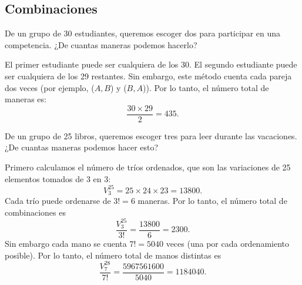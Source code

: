 \documentclass[12pt,a4paper]{book}
\begin{document}
    \subsection{Combinaciones}

    \begin{mdframed}[style=mdgraybox,frametitle={Problema 20: Selección de dos estudiantes}]
        De un grupo de 30 estudiantes, queremos escoger dos para participar en una
        competencia. ¿De cuantas maneras podemos hacerlo?
    \end{mdframed}

    \begin{solucion}
        El primer estudiante puede ser cualquiera de los 30. El segundo estudiante puede
        ser cualquiera de los 29 restantes. Sin embargo, este método cuenta cada pareja
        dos veces (por ejemplo, ($A,B$) y ($B,A$)). Por lo tanto, el número total de maneras
        es:
        \begin{equation*}
            \frac{30\times29}{2}=435.
        \end{equation*}
    \end{solucion}

    \begin{mdframed}[style=mdgraybox,frametitle={Problema 22: Mano de dominó}]
        De un grupo de 25 libros, queremos escoger tres para leer durante las vacaciones.
        ¿De cuantas maneras podemos hacer esto?
    \end{mdframed}

    \begin{solucion}
        Primero calculamos el número de tríos ordenados, que son las variaciones de 25 elementos
        tomados de 3 en 3:
        \begin{equation*}
            V_{3}^{25}=25\times24\times23=13800.
        \end{equation*}
        Cada trío puede ordenarse de $3!=6$ maneras. Por lo tanto, el número total de
        combinaciones es
        \begin{equation*}
            \frac{V_{3}^{25}}{3!}=\frac{13800}{6}=2300.
        \end{equation*}
        Sin embargo cada mano se cuenta $7!=5040$ veces (una por cada ordenamiento posible).
        Por lo tanto, el número total de manos distintas es
        \begin{equation*}
            \frac{V_{7}^{28}}{7!}=\frac{5967561600}{5040}=1184040.
        \end{equation*}
    \end{solucion}
\end{document}
